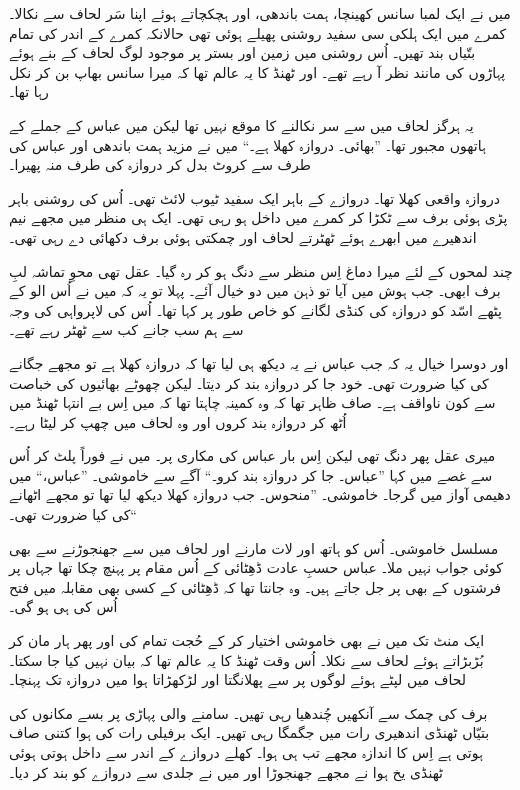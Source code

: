 \documentclass{article}
\begin{document}
میں نے ایک لمبا سانس کھینچا، ہمت باندھی، اور ہچکچاتے ہوئے اپنا سَر لحاف سے نکالا۔ کمرے میں ایک ہلکی سی سفید روشنی پھیلے ہوئی تھی حالانکہ کمرے کے اندر کی تمام بتّیاں بند تھیں۔ اُس روشنی میں زمین اور بستر پر موجود لوگ لحاف کے بنے ہوئے پہاڑوں کی مانند نظر آ رہے تھے۔ اور ٹھنڈ کا یہ عالم تھا کہ میرا سانس بھاپ بن کر نکل رہا تھا۔

یہ ہرگز لحاف میں سے سر نکالنے کا موقع نہیں تھا لیکن میں عباس کے جملے کے ہاتھوں مجبور تھا۔ ''بھائی۔ دروازہ کھلا ہے۔`` میں نے مزید ہمت باندھی اور عباس کی طرف سے کروٹ بدل کر دروازہ کی طرف منہ پھیرا۔

دروازہ واقعی کھلا تھا۔ دروازے کے باہر ایک سفید ٹیوب لائٹ تھی۔ اُس کی روشنی باہر پڑی ہوئی برف سے ٹکڑا کر کمرے میں داخل ہو رہی تھی۔ ایک ہی منظر میں مجھے نیم اندھیرے میں ابھرے ہوئے ٹھٹرتے لحاف اور چمکتی ہوئی برف دکھائی دے رہی تھی۔

چند لمحوں کے لئے میرا دماغ اِس منظر سے دنگ ہو کر رہ گیا۔ عقل تھی محوِ تماشہ لبِ برف ابھی۔ جب ہوش میں آیا تو ذہن میں دو خیال آئے۔ پہلا تو یہ کہ میں نے اُس الو کے پٹھے اسّد کو دروازہ کی کنڈی لگانے کو خاص طور پر کہا تھا۔ اُس کی لاپرواہی کی وجہ سے ہم سب جانے کب سے ٹھٹر رہے تھے۔

اور دوسرا خیال یہ کہ جب عباس نے یہ دیکھ ہی لیا تھا کہ دروازہ کھلا ہے تو مجھے جگانے کی کیا ضرورت تھی۔ خود جا کر دروازہ بند کر دیتا۔ لیکن چھوٹے بھائیوں کی خباصت سے کون ناواقف ہے۔ صاف ظاہر تھا کہ وہ کمینہ چاہتا تھا کہ میں اِس بے انتہا ٹھنڈ میں اُٹھ کر دروازہ بند کروں اور وہ لحاف میں چھپ کر لیٹا رہے۔

میری عقل پھر دنگ تھی لیکن اِس بار عباس کی مکاری پر۔ میں نے فوراً پلٹ کر اُس سے غصے میں کہا ''عباس۔ جا کر دروازہ بند کرو۔`` آگے سے خاموشی۔ ''عباس،`` میں دھیمی آواز میں گرجا۔ خاموشی۔ ''منحوس۔ جب دروازہ کھلا دیکھ لیا تھا تو مجھے اٹھانے کی کیا ضرورت تھی۔``

مسلسل خاموشی۔ اُس کو ہاتھ اور لات مارنے اور لحاف میں سے جھنجوڑنے سے بھی کوئی جواب نہیں ملا۔ عباس حسبِ عادت ڈھِٹائی کے اُس مقام پر پہنچ چکا تھا جہاں پر فرشتوں کے بھی پر جل جاتے ہیں۔ وہ جانتا تھا کہ ڈھِٹائی کے کسی بھی مقابلہ میں فتح اُس کی ہی ہو گی۔

ایک منٹ تک میں نے بھی خاموشی اختیار کر کے حُجت تمام کی اور پھر ہار مان کر بُڑبڑاتے ہوئے لحاف سے نکلا۔ اُس وقت ٹھنڈ کا یہ عالم تھا کہ بیان نہیں کیا جا سکتا۔ لحاف میں لپٹے ہوئے لوگوں پر سے پھلانگتا اور لڑکھڑاتا ہوا میں دروازہ تک پہنچا۔

برف کی چمک سے آنکھیں چُندھیا رہی تھیں۔ سامنے والی پہاڑی پر بسے مکانوں کی بتیّاں ٹھنڈی اندھیری رات میں جگمگا رہی تھیں۔ ایک برفیلی رات کی ہوا کتنی صاف ہوتی ہے اِس کا اندازہ مجھے تب ہی ہوا۔ کھلے دروازے کے اندر سے داخل ہوتی ہوئی ٹھنڈی یخ ہوا نے مجھے جھنجوڑا اور میں نے جلدی سے دروازے کو بند کر دیا۔
\end{document}
